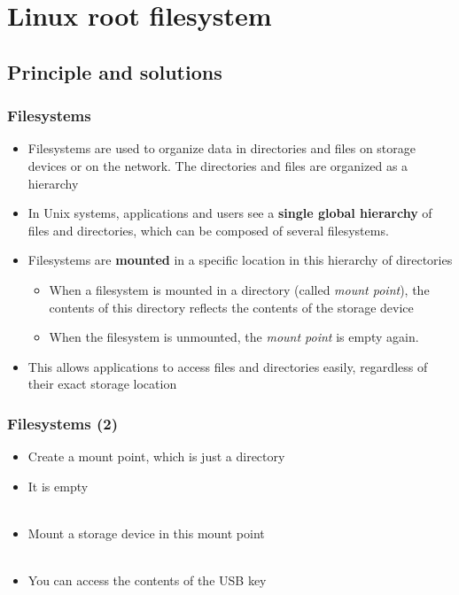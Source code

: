 \section{Linux root filesystem}

\subsection{Principle and solutions}

\begin{frame}
  \frametitle{Filesystems}
  \begin{itemize}
  \item Filesystems are used to organize data in directories and files
    on storage devices or on the network. The directories and files
    are organized as a hierarchy
  \item In Unix systems, applications and users see a {\bf single
      global hierarchy} of files and directories, which can be
    composed of several filesystems.
  \item Filesystems are {\bf mounted} in a specific location in this
    hierarchy of directories
    \begin{itemize}
    \item When a filesystem is mounted in a directory (called {\em
        mount point}), the contents of this directory reflects the
      contents of the storage device
    \item When the filesystem is unmounted, the {\em mount point} is
      empty again.
    \end{itemize}
  \item This allows applications to access files and directories easily,
    regardless of their exact storage location
  \end{itemize}
\end{frame}

\begin{frame}
  \frametitle{Filesystems (2)}
  \begin{itemize}
  \item Create a mount point, which is just a directory\\
  \item It is empty\\
    \\
    \code{$}
  \item Mount a storage device in this mount point\\
    \\
    \code{$}
  \item You can access the contents of the USB key\\
    \\
    \\
    \code{$}
  \end{itemize}
\end{frame}

